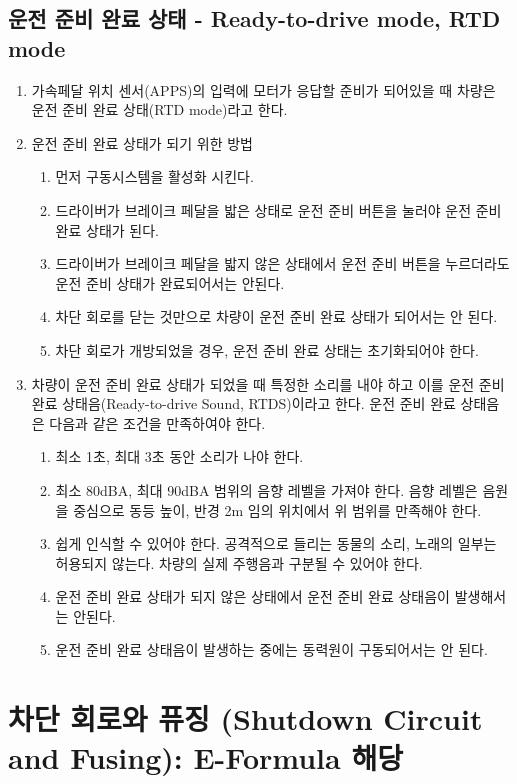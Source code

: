 \documentclass[final,a4paper,10pt]{report}
\begin{document}
\section{운전 준비 완료 상태 - Ready-to-drive mode, RTD mode}
\begin{enumerate}
  \item 가속페달 위치 센서(APPS)의 입력에 모터가 응답할 준비가 되어있을 때 차량은 운전 준비 완료 상태(RTD mode)라고 한다.
  
  \item 운전 준비 완료 상태가 되기 위한 방법
    \begin{enumerate}
      \item 먼저 구동시스템을 활성화 시킨다.
      \item 드라이버가 브레이크 페달을 밟은 상태로 운전 준비 버튼을 눌러야 운전 준비 완료 상태가 된다.
      \item 드라이버가 브레이크 페달을 밟지 않은 상태에서 운전 준비 버튼을 누르더라도 운전 준비 상태가 완료되어서는 안된다.
      \item 차단 회로를 닫는 것만으로 차량이 운전 준비 완료 상태가 되어서는 안 된다.
      \item 차단 회로가 개방되었을 경우, 운전 준비 완료 상태는 초기화되어야 한다.
    \end{enumerate}
    
  \item 차량이 운전 준비 완료 상태가 되었을 때 특정한 소리를 내야 하고 이를 운전 준비 완료 상태음(Ready-to-drive Sound, RTDS)이라고 한다. 운전 준비 완료 상태음은 다음과 같은 조건을 만족하여야 한다.
    \begin{enumerate}
      \item 최소 1초, 최대 3초 동안 소리가 나야 한다.
      \item 최소 80dBA, 최대 90dBA 범위의 음향 레벨을 가져야 한다. 음향 레벨은 음원을 중심으로 동등 높이, 반경 2m 임의 위치에서 위 범위를 만족해야 한다.
      \item 쉽게 인식할 수 있어야 한다. 공격적으로 들리는 동물의 소리, 노래의 일부는 허용되지 않는다. 차량의 실제 주행음과 구분될 수 있어야 한다.
      \item 운전 준비 완료 상태가 되지 않은 상태에서 운전 준비 완료 상태음이 발생해서는 안된다.
      \item 운전 준비 완료 상태음이 발생하는 중에는 동력원이 구동되어서는 안 된다.
    \end{enumerate}
\end{enumerate}

\chapter{차단 회로와 퓨징 (Shutdown Circuit and Fusing): E-Formula 해당}
\end{document}
